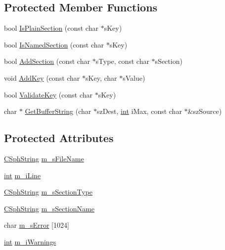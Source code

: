 \subsection*{Protected Member Functions}
\begin{DoxyCompactItemize}
\item 
bool \hyperlink{classCSphConfigParser_ac748efc2cd4bf410c70bd658e827a683}{Is\-Plain\-Section} (const char $\ast$s\-Key)
\item 
bool \hyperlink{classCSphConfigParser_a16697bf4066a4481a6e4c4c0473dc76d}{Is\-Named\-Section} (const char $\ast$s\-Key)
\item 
bool \hyperlink{classCSphConfigParser_ab6492020e24c5f1a32f79aaca70b888c}{Add\-Section} (const char $\ast$s\-Type, const char $\ast$s\-Section)
\item 
void \hyperlink{classCSphConfigParser_a7d5e7edb12cb241c054ff35d7a7f845a}{Add\-Key} (const char $\ast$s\-Key, char $\ast$s\-Value)
\item 
bool \hyperlink{classCSphConfigParser_a938d559935671cf6ee44c570f0f47fc3}{Validate\-Key} (const char $\ast$s\-Key)
\item 
char $\ast$ \hyperlink{classCSphConfigParser_a560454bebf023d2ec69ad936e3c36291}{Get\-Buffer\-String} (char $\ast$sz\-Dest, \hyperlink{sphinxexpr_8cpp_a4a26e8f9cb8b736e0c4cbf4d16de985e}{int} i\-Max, const char $\ast$\&sz\-Source)
\end{DoxyCompactItemize}
\subsection*{Protected Attributes}
\begin{DoxyCompactItemize}
\item 
\hyperlink{structCSphString}{C\-Sph\-String} \hyperlink{classCSphConfigParser_ac5023c857235d9ab1649f69b6937fd03}{m\-\_\-s\-File\-Name}
\item 
\hyperlink{sphinxexpr_8cpp_a4a26e8f9cb8b736e0c4cbf4d16de985e}{int} \hyperlink{classCSphConfigParser_aa928dbd9a23014593c416ba11a259a9c}{m\-\_\-i\-Line}
\item 
\hyperlink{structCSphString}{C\-Sph\-String} \hyperlink{classCSphConfigParser_aee98856a91de6866b13b1bcc311d19b3}{m\-\_\-s\-Section\-Type}
\item 
\hyperlink{structCSphString}{C\-Sph\-String} \hyperlink{classCSphConfigParser_a2b27b7a6dc0325826be8251809c47978}{m\-\_\-s\-Section\-Name}
\item 
char \hyperlink{classCSphConfigParser_a615a238196d0ace41a3665270f4ca75b}{m\-\_\-s\-Error} \mbox{[}1024\mbox{]}
\item 
\hyperlink{sphinxexpr_8cpp_a4a26e8f9cb8b736e0c4cbf4d16de985e}{int} \hyperlink{classCSphConfigParser_ac0e07431f0be63bb9ebb8eadd72c24fc}{m\-\_\-i\-Warnings}
\end{DoxyCompactItemize}
